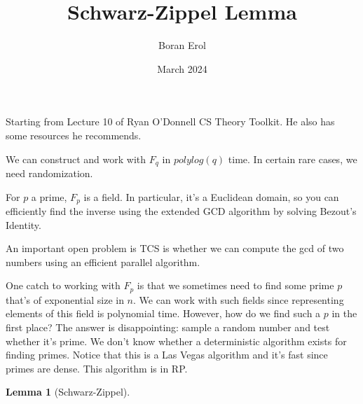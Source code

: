 \documentclass{article}
\title{Schwarz-Zippel Lemma}
\date{March 2024}
\author{Boran Erol}
\theoremstyle{definition}
\newtheorem{lemma}[theorem]{Lemma}
\begin{document}
\maketitle

Starting from Lecture 10 of Ryan O'Donnell CS Theory Toolkit. He also has some resources he recommends.

We can construct and work with $F_{q}$ in $polylog(q)$ time. In certain rare cases,
we need randomization.

For $p$ a prime, $F_{p}$ is a field. In particular, it's a Euclidean domain, so you
can efficiently find the inverse using the extended GCD algorithm by solving 
Bezout's Identity.

An important open problem is TCS is whether we can compute the gcd of two numbers
using an efficient parallel algorithm.

One catch to working with $F_{p}$ is that we sometimes need to find some prime $p$ that's
of exponential size in $n$. We can work with such fields since representing elements of this field
is polynomial time. However, how do we find such a $p$ in the first place? The answer is disappointing:
sample a random number and test whether it's prime. We don't know whether a deterministic
algorithm exists for finding primes. Notice that this is a Las Vegas algorithm and it's fast
since primes are dense. This algorithm is in RP.



\begin{lemma}[Schwarz-Zippel]
    
\end{lemma}
\end{document}
